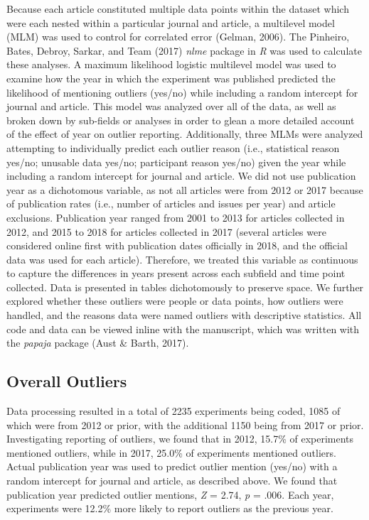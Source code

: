 \documentclass[english,,man]{apa6}
\theoremstyle{definition}
\theoremstyle{definition}
\theoremstyle{definition}
\theoremstyle{remark}
\begin{document}
Because each article constituted multiple data points within the dataset
which were each nested within a particular journal and article, a
multilevel model (MLM) was used to control for correlated error (Gelman,
2006). The Pinheiro, Bates, Debroy, Sarkar, and Team (2017) \emph{nlme}
package in \emph{R} was used to calculate these analyses. A maximum
likelihood logistic multilevel model was used to examine how the year in
which the experiment was published predicted the likelihood of
mentioning outliers (yes/no) while including a random intercept for
journal and article. This model was analyzed over all of the data, as
well as broken down by sub-fields or analyses in order to glean a more
detailed account of the effect of year on outlier reporting.
Additionally, three MLMs were analyzed attempting to individually
predict each outlier reason (i.e., statistical reason yes/no; unusable
data yes/no; participant reason yes/no) given the year while including a
random intercept for journal and article. We did not use publication
year as a dichotomous variable, as not all articles were from 2012 or
2017 because of publication rates (i.e., number of articles and issues
per year) and article exclusions. Publication year ranged from 2001 to
2013 for articles collected in 2012, and 2015 to 2018 for articles
collected in 2017 (several articles were considered online first with
publication dates officially in 2018, and the official data was used for
each article). Therefore, we treated this variable as continuous to
capture the differences in years present across each subfield and time
point collected. Data is presented in tables dichotomously to preserve
space. We further explored whether these outliers were people or data
points, how outliers were handled, and the reasons data were named
outliers with descriptive statistics. All code and data can be viewed
inline with the manuscript, which was written with the \emph{papaja}
package (Aust \& Barth, 2017).

\subsection{Overall Outliers}\label{overall-outliers}

Data processing resulted in a total of 2235 experiments being coded,
1085 of which were from 2012 or prior, with the additional 1150 being
from 2017 or prior. Investigating reporting of outliers, we found that
in 2012, 15.7\% of experiments mentioned outliers, while in 2017, 25.0\%
of experiments mentioned outliers. Actual publication year was used to
predict outlier mention (yes/no) with a random intercept for journal and
article, as described above. We found that publication year predicted
outlier mentions, \emph{Z} = 2.74, \emph{p} = .006. Each year,
experiments were 12.2\% more likely to report outliers as the previous
year.
\end{document}
